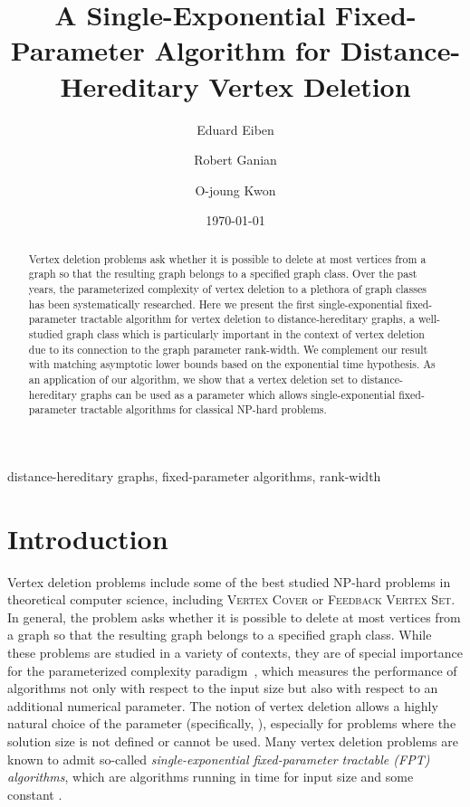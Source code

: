 \documentclass[11pt]{elsarticle}
\begin{document}
\title{A Single-Exponential Fixed-Parameter Algorithm for Distance-Hereditary Vertex Deletion}
\author[Vienna]{Eduard Eiben}
\author[Vienna]{Robert Ganian}
\author[Kwon]{O-joung Kwon}
\address[Vienna]{Algorithms and Complexity Group, TU Wien, Vienna, Austria}
\address[Kwon]{Logic and Semantics, Technische Universit\"at Berlin, Germany}
\date{\today}
\begin{abstract}
Vertex deletion problems ask whether it is possible to delete at most  vertices from a graph so that the resulting graph belongs to a specified graph class. Over the past years, the parameterized complexity of vertex deletion to a plethora of graph classes has been systematically researched. Here we present the first single-exponential fixed-parameter tractable algorithm for vertex deletion to distance-hereditary graphs, a well-studied graph class which is particularly important in the context of vertex deletion due to its connection to the graph parameter rank-width. We complement our result with matching asymptotic lower bounds based on the exponential time hypothesis. As an application of our algorithm, we show that a vertex deletion set to distance-hereditary graphs can be used as a parameter which allows single-exponential fixed-parameter tractable algorithms for classical NP-hard problems.
\end{abstract}
\begin{keyword}
 distance-hereditary graphs, fixed-parameter algorithms, rank-width
\end{keyword}


\maketitle




\section{Introduction}\label{sec:introduction}
Vertex deletion problems include some of the best studied NP-hard problems in theoretical computer science, including \textsc{Vertex Cover} or \textsc{Feedback Vertex Set}. In general, the problem asks whether it is possible to delete at most  vertices from a graph so that the resulting graph belongs to a specified graph class. While these problems are studied in a variety of contexts, they are of special importance for the parameterized complexity paradigm~\cite{DowneyF13,CyganFKLMPPS15}, which measures the performance of algorithms not only with respect to the input size but also with respect to an additional numerical parameter. The notion of vertex deletion allows a highly natural choice of the parameter (specifically, ), especially for problems where the solution size is not defined or cannot be used. Many vertex deletion problems are known to admit so-called \emph{single-exponential fixed-parameter tractable (FPT) algorithms}, which are algorithms running in time  for input size  and some constant .
\end{document}
